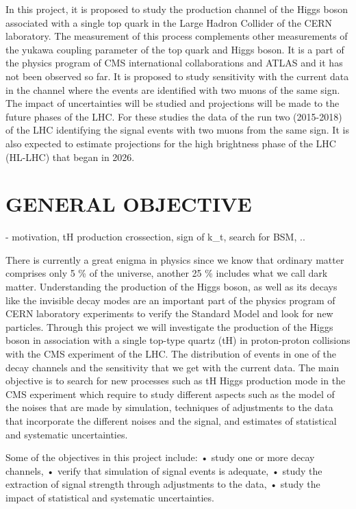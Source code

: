 \documentclass[final,3p]{CSP}
\begin{document}
In this project, it is proposed to study the production channel of the Higgs boson associated with a single top quark in the Large 
Hadron Collider of the CERN laboratory. The measurement of this process complements other measurements of the yukawa coupling parameter 
of the top quark and Higgs boson. It is a part of the physics program of CMS international collaborations and ATLAS and it has not been 
observed so far. It is proposed to study sensitivity with the current data in the channel where the events are identified with two muons 
of the same sign. The impact of uncertainties will be studied and projections will be made to the future phases of the LHC. For these 
studies the data of the run two (2015-2018) of the LHC identifying the signal events with two muons from the same sign. It is also 
expected to estimate projections for the high brightness phase of the LHC (HL-LHC) that began in 2026.

\section{GENERAL OBJECTIVE}
- motivation, tH production crossection, sign of k_t, search for BSM, ..

There is currently a great enigma in physics since we know that ordinary matter comprises only 5 \% of the universe, another 
25 \% includes what we call dark matter. Understanding the production of the Higgs boson, as well as its decays like the invisible 
decay modes are an important part of the physics program of CERN laboratory experiments to verify the Standard Model and look for new 
particles. Through this project we will investigate the production of the Higgs boson in association with a single top-type quartz (tH) 
in proton-proton collisions with the CMS experiment of the LHC. The distribution of events in one of the decay channels and the 
sensitivity that we get with the current data. The main objective is to search for new processes such as tH Higgs production mode in the 
CMS experiment which require to study different aspects such as the model of the noises that are made by simulation, techniques of 
adjustments to the data that incorporate the different noises and the signal, and estimates of statistical and systematic uncertainties.

Some of the objectives in this project include:
• study one or more decay channels,
• verify that simulation of signal events is adequate,
• study the extraction of signal strength through adjustments to the data,
• study the impact of statistical and systematic uncertainties.
\end{document}
